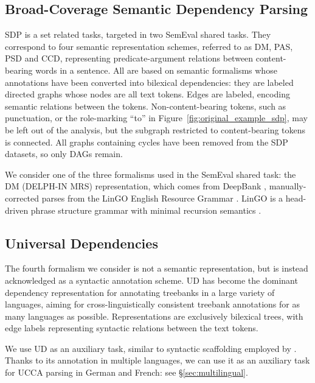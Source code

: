\documentclass[11pt,a4paper]{article}
\begin{document}
\subsection{Broad-Coverage Semantic Dependency Parsing}\label{sec:sdp}

SDP \cite{oepen2014semeval,oepen2015semeval,oepen2016towards}
is a set related tasks, targeted in two SemEval shared tasks.
They correspond to four semantic representation schemes, referred to as
DM, PAS, PSD and CCD, representing
predicate-argument relations between content-bearing words in a sentence.
All are based on semantic formalisms whose annotations have been
converted into bilexical dependencies:
they are labeled directed graphs whose nodes are all text tokens.
Edges are labeled, encoding semantic relations between the tokens.
Non-content-bearing tokens, such as punctuation,
or the role-marking ``to'' in Figure~\ref{fig:original_example_sdp},
may be left out of the analysis,
but the subgraph restricted to content-bearing tokens is connected.
All graphs containing cycles have been removed from the SDP datasets,
so only DAGs remain.

We consider one of the three formalisms used in the SemEval shared task:
the DM (DELPH-IN MRS) representation, which comes
from DeepBank \cite{flickinger2012deepbank},
manually-corrected parses from the LinGO
English Resource Grammar \cite{copestake2000open}.
LinGO is a head-driven phrase
structure grammar \cite[HPSG; ][]{pollard1994head}
with minimal recursion semantics \cite{copestake2005minimal}.

\subsection{Universal Dependencies}\label{sec:ud}

The fourth formalism we consider is not a semantic representation, but
is instead acknowledged as a syntactic annotation scheme.
UD \cite{nivre2016universal,11234/1-2515} has become
the dominant dependency representation for
annotating treebanks in a large variety of languages,
aiming for cross-linguistically consistent treebank
annotations for as many languages as possible.
Representations are exclusively bilexical trees, with edge labels representing
syntactic relations between the text tokens.

We use UD as an auxiliary task,
similar to syntactic scaffolding employed by \cite{swayamdipta2017frame}.
Thanks to its annotation in multiple languages, we can use it as an auxiliary task
for UCCA parsing in German and French: see \S\ref{sec:multilingual}.
\end{document}
